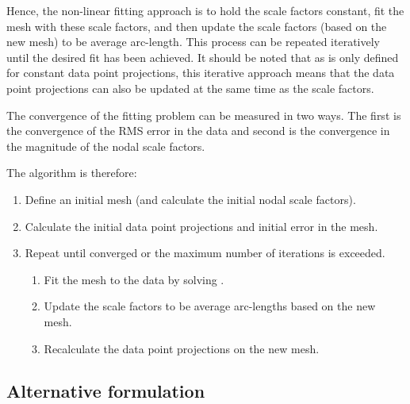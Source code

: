 Hence, the non-linear fitting approach is to hold the scale factors constant, fit
the mesh with these scale factors, and then update the scale factors (based on
the new mesh) to be average arc-length. This process can be repeated iteratively
until the desired fit has been achieved. It should be noted that as
 is only defined for constant data point projections,
this iterative approach means that the data point projections can also be
updated at the same time as the scale factors.

The convergence of the fitting problem can be measured in two ways. The first
is the convergence of the RMS error in the data and second is the convergence
in the magnitude of the nodal scale factors.

The algorithm is therefore:
\begin{enumerate}
\item Define an initial mesh (and calculate the initial nodal scale factors).
  \item Calculate the initial data point projections and initial error in the
    mesh.
  \item Repeat until converged or the maximum number of iterations is exceeded.
  \begin{enumerate}
    \item Fit the mesh to the data by solving .
    \item Update the scale factors to be average arc-lengths based on the new
      mesh.
    \item Recalculate the data point projections on the new mesh.
  \end{enumerate}
\end{enumerate}

\subsection{Alternative formulation}
\label{sec:alternativeformulation}

